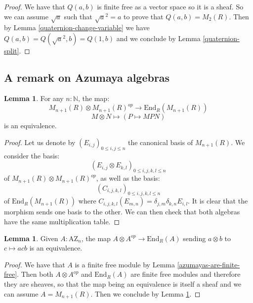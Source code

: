 \documentclass[10pt,a4paper]{article}
\theoremstyle{definition}
\newtheorem{lemma}[theorem]{Lemma}
\newcommand{\AZ}{\mathrm{AZ}}
\newcommand{\N}{\mathbb{N}}
\begin{document}
\begin{proof}
We have that $Q(a,b)$ is finite free as a vector space so it is a sheaf. So we can assume $\sqrt{a}$ such that $\sqrt{a}^2 = a$ to prove that $Q(a,b) = M_2(R)$. Then by Lemma \ref{quaternion-change-variable} we have $Q(a,b) = Q(\sqrt{a}^2,b) = Q(1,b)$ and we conclude by Lemma \ref{quaternion-split}.
\end{proof}


\subsection{A remark on Azumaya algebras}

\begin{lemma}\label{MnR-endomorphism-multiplication}
For any $n:\N$, the map:
\[M_{n+1}(R)\otimes M_{n+1}(R)^{op}\to \mathrm{End}_R(M_{n+1}(R))\]
\[M\otimes N\mapsto (P\mapsto MPN)\]
is an equivalence.
\end{lemma}

\begin{proof}
Let us denote by $(E_{i,j})_{0\leq i,j\leq n}$ the canonical basis of $M_{n+1}(R)$. We consider the basis: 
\[(E_{i,j}\otimes E_{k,l})_{0\leq i,j,k,l\leq n}\] 
of $M_{n+1}(R)\otimes M_{n+1}(R)^{op}$, as well as the basis:
\[(C_{i,j,k,l})_{0\leq i,j,k,l\leq n}\] 
of $\mathrm{End}_R(M_{n+1}(R))$ where $C_{i,j,k,l}(E_{m,n}) = \delta_{j,m}\delta_{k,n} E_{i,l}$. It is clear that the morphism sends one basis to the other. We can then check that both algebras have the same multiplication table. %
\end{proof}

\begin{lemma}
Given $A:\AZ_n$, the map $A\otimes A^{op}\to \mathrm{End}_R(A)$ sending $a\otimes b$ to $c\mapsto acb$ is an equivalence.
\end{lemma}

\begin{proof}
We have that $A$ is a finite free module by Lemma \ref{azumayas-are-finite-free}. Then both $A\otimes A^{op}$ and $\mathrm{End}_R(A)$ are finite free modules and therefore they are sheaves, so that the map being an equivalence is itself a sheaf and we can assume $A=M_{n+1}(R)$. Then we conclude by Lemma \ref{MnR-endomorphism-multiplication}.
\end{proof}
\end{document}
